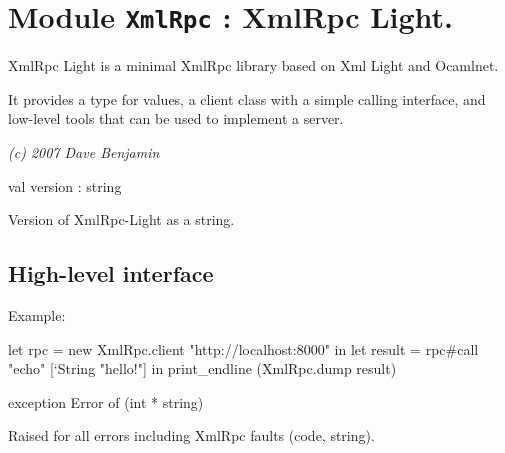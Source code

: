 \documentclass[11pt]{article}
\begin{document}
\tableofcontents
\section{Module {\tt{XmlRpc}} : XmlRpc Light.}
\label{module:XmlRpc}



    XmlRpc Light is a minimal XmlRpc library based on Xml Light and Ocamlnet.


    It provides a type for values, a client class with a simple calling
    interface, and low-level tools that can be used to implement a server.


    {\it (c) 2007 Dave Benjamin}



\ocamldocvspace{0.5cm}



\label{val:XmlRpc.version}\begin{ocamldoccode}
val version : string
\end{ocamldoccode}
\begin{ocamldocdescription}
Version of XmlRpc-Light as a string.


\end{ocamldocdescription}




\subsection{High-level interface}




Example: \begin{ocamldoccode}

    let rpc = new XmlRpc.client "http://localhost:8000" in
    let result = rpc#call "echo" [`String "hello!"] in
    print_endline (XmlRpc.dump result) 
\end{ocamldoccode}




\label{exception:XmlRpc.Error}\begin{ocamldoccode}
exception Error of (int * string)
\end{ocamldoccode}
\begin{ocamldocdescription}
Raised for all errors including XmlRpc faults (code, string).


\end{ocamldocdescription}
\end{document}
